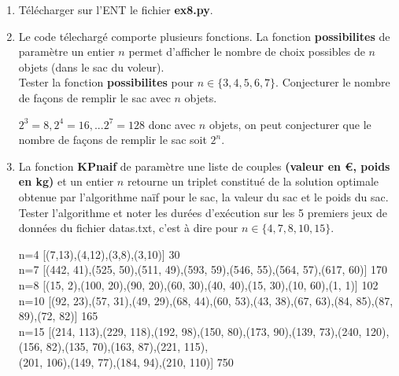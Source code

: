 \documentclass[12pt,french]{article}
\begin{document}
\begin{enumerate}
	\item Télécharger sur l'ENT le fichier \textbf{ex8.py}.
	\item Le code télechargé comporte plusieurs fonctions. La fonction \textbf{possibilites} de paramètre un entier $n$ permet d'afficher le nombre de choix possibles de $n$ objets (dans le sac du voleur).\\	Tester la fonction  \textbf{possibilites} pour   \(n \in \{3,4,5,6,7\} \). Conjecturer le nombre de façons de remplir le sac avec $n$ objets.
	\begin{tcolorbox}[enhanced,attach boxed title to top center={yshift=-3mm,yshifttext=-1mm},
		colback=blue!5!white,colframe=blue!75!black,colbacktitle=blue!25!black,
		title=solution :, fonttitle=\bfseries,
		boxed title style={size=small,colframe=green!25!black} ]
$2^3=8, 2^4=16,...2^7=128$ donc avec $n$ objets, on peut conjecturer que le nombre de façons de remplir le sac soit  $2^n$.
	\end{tcolorbox}
	
	\item La fonction \textbf{KPnaif} de paramètre une liste de couples  \textbf{(valeur en €, poids en kg)} et un entier $n$  retourne  un triplet constitué de la solution optimale obtenue par l'algorithme naïf pour le sac, la valeur du sac et le poids du sac. Tester l'algorithme et noter les durées d'exécution sur les 5 premiers jeux de données du fichier datas.txt, c'est à dire pour $n  \in \{4,7,8,10,15 \}$.
	
	\begin{tcolorbox}[enhanced,attach boxed title to top center={yshift=-3mm,yshifttext=-1mm},
		colback=blue!5!white,colframe=blue!75!black,colbacktitle=blue!25!black,
		title=solution :, fonttitle=\bfseries,
		boxed title style={size=small,colframe=green!25!black} ]
			n=4  \tabto{1.5cm}[(7,13),(4,12),(3,8),(3,10)] 30\\
		n=7 \tabto{1.5cm}[(442, 41),(525, 50),(511, 49),(593, 59),(546, 55),(564, 57),(617, 60)] 170\\
		n=8   \tabto{1.5cm}[(15, 2),(100, 20),(90, 20),(60, 30),(40, 40),(15, 30),(10, 60),(1, 1)] 102\\
		n=10  \tabto{1.5cm}[(92, 23),(57, 31),(49, 29),(68, 44),(60, 53),(43, 38),(67, 63),(84, 85),(87, 89),(72, 82)] 165\\
		n=15  \tabto{1.5cm}[(214, 113),(229, 118),(192, 98),(150, 80),(173, 90),(139, 73),(240, 120),(156, 82),(135, 70),(163, 87),(221, 115),\\
		\tabto{1.5cm}(201, 106),(149, 77),(184, 94),(210, 110)] 750\\
		

\end{tcolorbox}
\end{enumerate}
\end{document}
